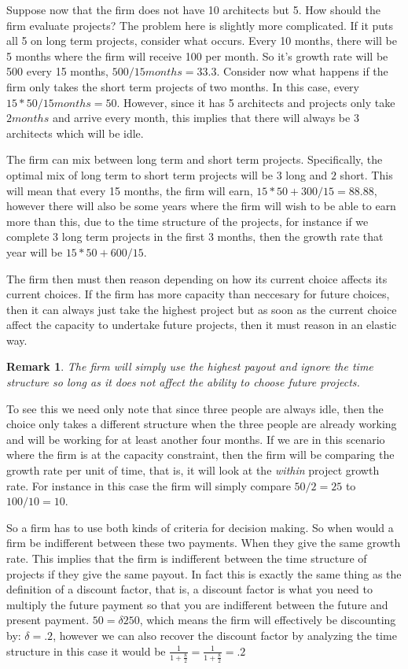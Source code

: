 \documentclass[12pt]{report}
\newtheorem{remark}{Remark}
\numberwithin{equation}{section}
\begin{document}
Suppose now that the firm does not have 10 architects but 5. How should the firm evaluate projects? The problem here is slightly more complicated. If it puts all 5 on long term projects, consider what occurs. Every 10 months, there will be 5 months where the firm will receive 100 per month. So it's growth rate will be 500 every 15 months, $500/15months=33.3$. Consider now what happens if the firm only takes the short term projects of two months. In this case, every $15*50/15 months=50$. However, since it has 5 architects and projects only take $2 months$ and arrive every month, this implies that there will always be 3 architects which will be idle. 

The firm can mix between long term and short term projects. Specifically, the optimal mix of long term to short term projects will be $3$ long and $2$ short. This will mean that every 15 months, the firm will earn, $15*50+300/15=88.88$, however there will also be some years where the firm will wish to be able to earn more than this, due to the time structure of the projects, for instance if we complete 3 long term projects in the first 3 months, then the growth rate that year will be $15*50+600/15$. 

The firm then must then reason depending on how its current choice affects its current choices. If the firm has more capacity than neccesary for future choices, then it can always just take the highest project but as soon as the current choice affect the capacity to undertake future projects, then it must reason in an elastic way. 

\begin{remark}
The firm will simply use the highest payout and ignore the time structure so long as it does not affect the ability to choose future projects. 
\end{remark}

To see this we need only note that since three people are always idle, then the choice only takes a different structure when the three people are already working and will be working for at least another four months. If we are in this scenario where the firm is at the capacity constraint, then the firm will be comparing the growth rate per unit of time, that is, it will look at the \textit{within} project growth rate. For instance in this case the firm will simply compare $50/2=25$ to $100/10=10$. 

So a firm has to use both kinds of criteria for decision making. So when would a firm be indifferent between these two payments. When they give the same growth rate. This implies that the firm is indifferent between the time structure of projects if they give the same payout. In fact this is exactly the same thing as the definition of a discount factor, that is, a discount factor is what you need to multiply the future payment so that you are indifferent between the future and present payment. $50= \delta 250$, which means the firm will effectively be discounting by: $\delta = .2$, however we can also recover the discount factor by analyzing the time structure in this case it would be $\frac{1}{1+\frac{8}{2}}=\frac{1}{1+\frac{8}{2}}=.2$
\end{document}
